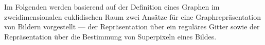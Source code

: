Im Folgenden werden basierend auf der Definition eines Graphen im zweidimensionalen  euklidischen Raum zwei Ansätze für eine Graphrepräsentation von Bildern vorgestellt — der Repräsentation über ein reguläres Gitter sowie der Repräsentation über die Bestimmung von Superpixeln eines Bildes.






